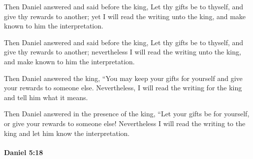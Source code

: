 			Then Daniel answered and said before the king, Let thy gifts be to thyself, and give thy rewards to another; yet I will read the writing unto the king, and make known to him the interpretation.

			\begin{versebox}
					\item[BHS] 
					\item[LXX] 
					\item[ASV] Then Daniel answered and said before the king, Let thy gifts be to thyself, and give thy rewards to another; nevertheless I will read the writing unto the king, and make known to him the interpretation.
					\item[NIV] Then Daniel answered the king, “You may keep your gifts for yourself and give your rewards to someone else. Nevertheless, I will read the writing for the king and tell him what it means.
					\item[NRSV] Then Daniel answered in the presence of the king, “Let your gifts be for yourself, or give your rewards to someone else! Nevertheless I will read the writing to the king and let him know the interpretation.
			\end{versebox}

		\paragraph{Daniel 5:18} %
			\label{DANIEL-5-18}

